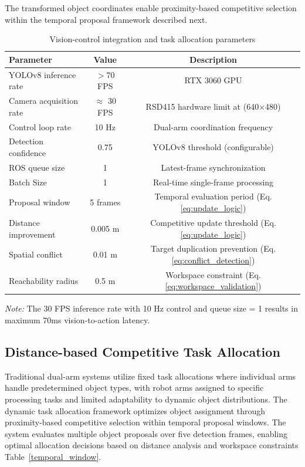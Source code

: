 \documentclass[pdflatex,sn-mathphys-num]{sn-jnl}%
\theoremstyle{thmstyleone}%
\theoremstyle{thmstylethree}%
\begin{document}
\noindent The transformed object coordinates enable proximity-based competitive selection within the temporal proposal framework described next.
\begin{table}[t]
    \centering
    \caption{{Vision-control integration and task allocation parameters}}
    \label{tab:visionparameters}
    \scriptsize
    \begin{tabular}{lcc}
        \toprule
        \textbf{Parameter} & \textbf{Value} & \textbf{Description} \\
        \midrule\midrule
        YOLOv8 inference rate & $>$70 FPS  & RTX 3060 GPU \\
        Camera acquisition rate & $\approx$ 30 FPS & RSD415 hardware limit at (640$\times$480) \\
        Control loop rate & 10 Hz    & Dual-arm coordination frequency \\
        Detection confidence & 0.75 & YOLOv8 threshold (configurable) \\
        ROS queue size & 1 & Latest-frame synchronization \\
        Batch Size & 1 & Real-time single-frame processing\\
        Proposal window & 5 frames & Temporal evaluation period (Eq.\ref{eq:update_logic}) \\
        Distance improvement & 0.005 m & Competitive update threshold (Eq.\ref{eq:update_logic}) \\
        Spatial conflict & 0.01 m & Target duplication prevention (Eq.\ref{eq:conflict_detection})  \\
        Reachability radius & 0.5 m     & Workspace constraint (Eq.\ref{eq:workspace_validation}) \\
        \midrule
    \end{tabular}
    \vspace{1mm}
    \begin{minipage}{0.98\columnwidth}
        \footnotesize \emph{Note:} The 30 FPS inference rate with 10 Hz control and queue size = 1 results in maximum 70ms vision-to-action latency.
    \end{minipage}
\end{table}
\subsection{Distance-based Competitive Task Allocation}
Traditional dual-arm systems utilize fixed task allocations where individual arms handle predetermined object types, with robot arms assigned to specific processing tasks and limited adaptability to dynamic object distributions. The dynamic task allocation framework optimizes object assignment through proximity-based competitive selection within temporal proposal windows. The system evaluates multiple object proposals over five detection frames, enabling optimal allocation decisions based on distance analysis and workspace constraints Table~\ref{temporal_window}.
\end{document}
